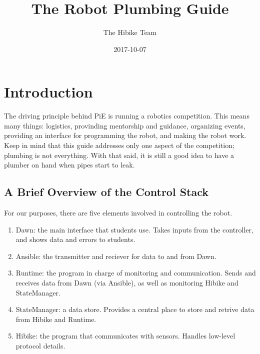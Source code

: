 \documentclass[12pt]{book}
\title{The Robot Plumbing Guide}
\date{2017-10-07}
\author{The Hibike Team}
\begin{document}
\maketitle

\tableofcontents

\chapter{Introduction}
The driving principle behind PiE is running a robotics competition. This means many things:
logistics, provinding mentorship and guidance, organizing events,
providing an interface for programming the robot, and making
the robot work. Keep in mind that this guide addresses only one aspect
of the competition; plumbing is not everything. With that said, it is still a good
idea to have a plumber on hand when pipes start to leak.
\section{A Brief Overview of the Control Stack}
For our purposes, there are five elements involved in controlling the robot.
\begin{enumerate}
	\item Dawn: the main interface that students use. Takes inputs from the controller,
	    and shows data and errors to students.
    \item Ansible: the transmitter and reciever for data to and from Dawn.
	\item Runtime: the program in charge of monitoring and communication. Sends and receives data from
        Dawn (via Ansible), as well as monitoring Hibike and StateManager.
	\item StateManager: a data store. Provides a central place to store and retrive data from Hibike
	    and Runtime.
	\item Hibike: the program that communicates with sensors. Handles low-level protocol details.
\end{enumerate}
\end{document}
